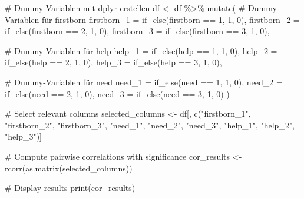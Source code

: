 \documentclass[
  letterpaper,
  DIV=11,
  numbers=noendperiod]{scrartcl}
\newenvironment{Shaded}{\begin{snugshade}}{\end{snugshade}}
\newcommand{\AttributeTok}[1]{\textcolor[rgb]{0.40,0.45,0.13}{#1}}
\newcommand{\CommentTok}[1]{\textcolor[rgb]{0.37,0.37,0.37}{#1}}
\newcommand{\DecValTok}[1]{\textcolor[rgb]{0.68,0.00,0.00}{#1}}
\newcommand{\FunctionTok}[1]{\textcolor[rgb]{0.28,0.35,0.67}{#1}}
\newcommand{\NormalTok}[1]{\textcolor[rgb]{0.00,0.23,0.31}{#1}}
\newcommand{\OtherTok}[1]{\textcolor[rgb]{0.00,0.23,0.31}{#1}}
\newcommand{\SpecialCharTok}[1]{\textcolor[rgb]{0.37,0.37,0.37}{#1}}
\newcommand{\StringTok}[1]{\textcolor[rgb]{0.13,0.47,0.30}{#1}}
\begin{document}
\begin{Shaded}
\begin{Highlighting}[]
\CommentTok{\# Dummy{-}Variablen mit dplyr erstellen}
\NormalTok{df }\OtherTok{\textless{}{-}}\NormalTok{ df }\SpecialCharTok{\%\textgreater{}\%}
  \FunctionTok{mutate}\NormalTok{(}
    \CommentTok{\# Dummy{-}Variablen für firstborn}
    \AttributeTok{firstborn\_1 =} \FunctionTok{if\_else}\NormalTok{(firstborn }\SpecialCharTok{==} \DecValTok{1}\NormalTok{, }\DecValTok{1}\NormalTok{, }\DecValTok{0}\NormalTok{),}
    \AttributeTok{firstborn\_2 =} \FunctionTok{if\_else}\NormalTok{(firstborn }\SpecialCharTok{==} \DecValTok{2}\NormalTok{, }\DecValTok{1}\NormalTok{, }\DecValTok{0}\NormalTok{),}
    \AttributeTok{firstborn\_3 =} \FunctionTok{if\_else}\NormalTok{(firstborn }\SpecialCharTok{==} \DecValTok{3}\NormalTok{, }\DecValTok{1}\NormalTok{, }\DecValTok{0}\NormalTok{),}
    
    \CommentTok{\# Dummy{-}Variablen für help}
    \AttributeTok{help\_1 =} \FunctionTok{if\_else}\NormalTok{(help }\SpecialCharTok{==} \DecValTok{1}\NormalTok{, }\DecValTok{1}\NormalTok{, }\DecValTok{0}\NormalTok{),}
    \AttributeTok{help\_2 =} \FunctionTok{if\_else}\NormalTok{(help }\SpecialCharTok{==} \DecValTok{2}\NormalTok{, }\DecValTok{1}\NormalTok{, }\DecValTok{0}\NormalTok{),}
    \AttributeTok{help\_3 =} \FunctionTok{if\_else}\NormalTok{(help }\SpecialCharTok{==} \DecValTok{3}\NormalTok{, }\DecValTok{1}\NormalTok{, }\DecValTok{0}\NormalTok{),}
    
    \CommentTok{\# Dummy{-}Variablen für need}
    \AttributeTok{need\_1 =} \FunctionTok{if\_else}\NormalTok{(need }\SpecialCharTok{==} \DecValTok{1}\NormalTok{, }\DecValTok{1}\NormalTok{, }\DecValTok{0}\NormalTok{),}
    \AttributeTok{need\_2 =} \FunctionTok{if\_else}\NormalTok{(need }\SpecialCharTok{==} \DecValTok{2}\NormalTok{, }\DecValTok{1}\NormalTok{, }\DecValTok{0}\NormalTok{),}
    \AttributeTok{need\_3 =} \FunctionTok{if\_else}\NormalTok{(need }\SpecialCharTok{==} \DecValTok{3}\NormalTok{, }\DecValTok{1}\NormalTok{, }\DecValTok{0}\NormalTok{)}
\NormalTok{  )}


\CommentTok{\# Select relevant columns}
\NormalTok{selected\_columns }\OtherTok{\textless{}{-}}\NormalTok{ df[, }\FunctionTok{c}\NormalTok{(}\StringTok{"firstborn\_1"}\NormalTok{, }
                           \StringTok{"firstborn\_2"}\NormalTok{,}
                           \StringTok{"firstborn\_3"}\NormalTok{,}
                           \StringTok{"need\_1"}\NormalTok{,}
                           \StringTok{"need\_2"}\NormalTok{,}
                           \StringTok{"need\_3"}\NormalTok{,}
                           \StringTok{"help\_1"}\NormalTok{,}
                           \StringTok{"help\_2"}\NormalTok{, }
                           \StringTok{"help\_3"}\NormalTok{)]}

\CommentTok{\# Compute pairwise correlations with significance}
\NormalTok{cor\_results }\OtherTok{\textless{}{-}} \FunctionTok{rcorr}\NormalTok{(}\FunctionTok{as.matrix}\NormalTok{(selected\_columns))}

\CommentTok{\# Display results}
\FunctionTok{print}\NormalTok{(cor\_results)}
\end{Highlighting}
\end{Shaded}
\end{document}

